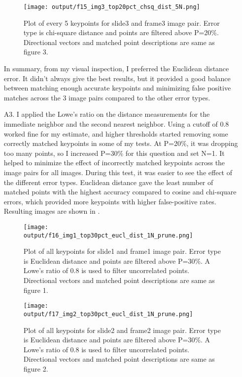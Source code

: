 \documentclass[12pt]{report}
\begin{document}
\begin{enumerate}
    \begin{figure}[H]
        \centering
        \texttt{[image: output/f15\_img3\_top20pct\_chsq\_dist\_5N.png]}
        \caption{Plot of every 5 keypoints for slide3 and frame3 image pair. Error type is chi-square distance and points are filtered above P=20\%. Directional 
        vectors and matched point descriptions are same as figure 3.}
        \label{fig:Figure15}
    \end{figure}

    In summary, from my visual inspection, I preferred the Euclidean distance error. It didn't always give the best results, but it provided a good balance between matching 
    enough accurate keypoints and minimizing false positive matches across the 3 image pairs compared to the other error types.

    \item[A3.] I applied the Lowe's ratio on the distance measurements for the immediate neighbor and the second nearest neighbor. Using a cutoff of 0.8 worked fine 
    for my estimate, and higher thresholds started removing some correctly matched keypoints in some of my tests. At P=20\%, it was dropping too many points, so I 
    increased P=30\% for this question and set N=1. It helped to minimize the effect of incorrectly matched keypoints across the image pairs for all images. During this 
    test, it was easier to see the effect of the different error types. Euclidean distance gave the least number of matched points with the highest accuracy compared to 
    cosine and chi-square errors, which provided more keypoints with higher false-positive rates. Resulting images are shown in .

    \begin{figure}[H]
        \centering
        \texttt{[image: output/f16\_img1\_top30pct\_eucl\_dist\_1N\_prune.png]}
        \caption{Plot of all keypoints for slide1 and frame1 image pair. Error type is Euclidean distance and points are filtered above P=30\%. A Lowe's ratio of 0.8 
        is used to filter uncorrelated points. Directional vectors and matched point descriptions are same as figure 1.}
        \label{fig:Figure16}
    \end{figure}

    \begin{figure}[H]
        \centering
        \texttt{[image: output/f17\_img2\_top30pct\_eucl\_dist\_1N\_prune.png]}
        \caption{Plot of all keypoints for slide2 and frame2 image pair. Error type is Euclidean distance and points are filtered above P=30\%. A Lowe's ratio of 0.8 
        is used to filter uncorrelated points. Directional vectors and matched point descriptions are same as figure 2.}
        \label{fig:Figure17}
    \end{figure}


\end{enumerate}
\end{document}
